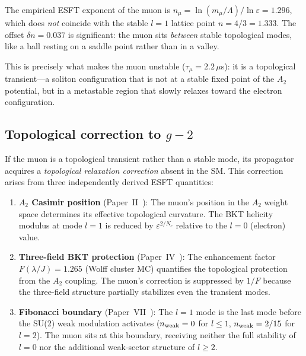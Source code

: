 ﻿\documentclass[twocolumn,preprintnumbers,amsmath,amssymb]{revtex4-2}
\begin{document}
The empirical ESFT exponent of the muon is $n_\mu = \ln(m_\mu/\Lambda)/\ln\varepsilon = 1.296$, which does \emph{not} coincide with the stable $l = 1$ lattice point $n = 4/3 = 1.333$. The offset $\delta n = 0.037$ is significant: the muon sits \emph{between} stable topological modes, like a ball resting on a saddle point rather than in a valley.

This is precisely what makes the muon unstable ($\tau_\mu = 2.2\,\mu$s): it is a topological transient---a soliton configuration that is not at a stable fixed point of the $A_2$ potential, but in a metastable region that slowly relaxes toward the electron configuration.

\subsection{Topological correction to $g{-}2$}

If the muon is a topological transient rather than a stable mode, its propagator acquires a \emph{topological relaxation correction} absent in the SM. This correction arises from three independently derived ESFT quantities:

\begin{enumerate}
\item \textbf{$A_2$ Casimir position} (Paper~II~\cite{Paper2}): The muon's position in the $A_2$ weight space determines its effective topological curvature. The BKT helicity modulus at mode $l = 1$ is reduced by $\varepsilon^{2/N_c}$ relative to the $l = 0$ (electron) value.

\item \textbf{Three-field BKT protection} (Paper~IV~\cite{Paper4}): The enhancement factor $F(\lambda/J) = 1.265$ (Wolff cluster MC) quantifies the topological protection from the $A_2$ coupling. The muon's correction is suppressed by $1/F$ because the three-field structure partially stabilizes even the transient modes.

\item \textbf{Fibonacci boundary} (Paper~VII~\cite{Paper7}): The $l = 1$ mode is the last mode before the SU(2) weak modulation activates ($n_{\rm weak} = 0$ for $l \leq 1$, $n_{\rm weak} = 2/15$ for $l = 2$). The muon sits at this boundary, receiving neither the full stability of $l = 0$ nor the additional weak-sector structure of $l \geq 2$.
\end{enumerate}
\end{document}
